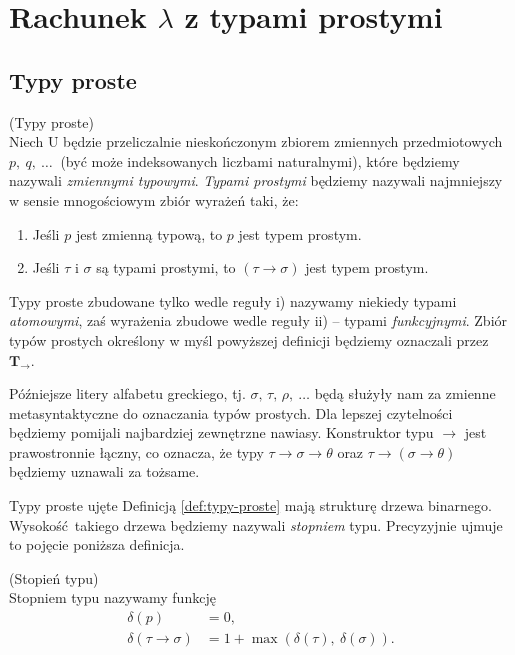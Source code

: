 \section{Rachunek \(\lambda\) z typami prostymi}


\subsection{Typy proste}\label{ssec:typy-proste}
\begin{definicja}\label{def:typy-proste}(Typy proste)\\
  Niech \(\mathrm{U}\) będzie przeliczalnie nieskończonym zbiorem zmiennych przedmiotowych \(p,\ q,\ \dots\ \) (być może indeksowanych liczbami naturalnymi), które będziemy nazywali \emph{zmiennymi typowymi}. \emph{Typami prostymi} będziemy nazywali najmniejszy w sensie mnogościowym zbiór wyrażeń taki, że:
\begin{enumerate}[label=\roman*)]
  \item Jeśli \(p\) jest zmienną typową, to \(p\) jest typem prostym.
  \item Jeśli \(\tau\) i \(\sigma\) są typami prostymi, to \(\left(\tau\to\sigma\right)\) jest typem prostym.
\end{enumerate}
\end{definicja}

Typy proste zbudowane tylko wedle reguły i) nazywamy niekiedy typami \emph{atomowymi}, zaś wyrażenia zbudowe wedle reguły ii) -- typami \emph{funkcyjnymi}. Zbiór typów prostych określony w myśl powyższej definicji będziemy oznaczali przez \(\mathbf{T_\to}\).

Późniejsze litery alfabetu greckiego, tj. \(\sigma,\, \tau,\, \rho,\ \dots\) będą służyły nam za zmienne metasyntaktyczne do oznaczania typów prostych. Dla lepszej czytelności będziemy pomijali najbardziej zewnętrzne nawiasy. Konstruktor typu \(\to\) jest prawostronnie łączny, co oznacza, że typy \(\tau\to\sigma\to\theta\) oraz \(\tau\to(\sigma\to\theta)\) będziemy uznawali za tożsame.

Typy proste ujęte Definicją \ref{def:typy-proste} mają strukturę drzewa binarnego. Wysokość takiego drzewa będziemy nazywali \emph{stopniem} typu. Precyzyjnie ujmuje to pojęcie poniższa definicja.
\begin{definicja}\label{def:stopien-typu}(Stopień typu)\\
  Stopniem typu nazywamy funkcję 
  \begin{align*}
    \delta(p) &= 0,\\
    \delta(\tau\to\sigma)&=1 + \max\left(\delta(\tau),\ \delta(\sigma)\right).
  \end{align*}
\end{definicja}

